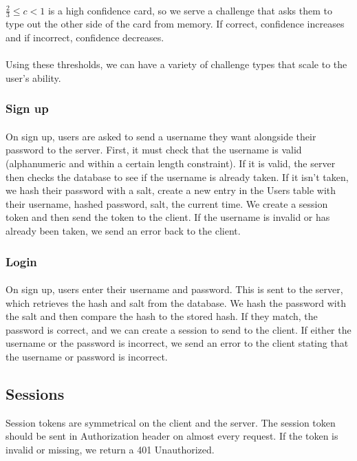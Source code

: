 \documentclass{report}
\begin{document}
\paragraph{}
$\frac{2}{3} \leq c < 1$ is a high confidence card, so we serve a challenge that asks them to type out the other side of the card from memory. If correct, confidence increases and if incorrect, confidence decreases.

\paragraph{}
Using these thresholds, we can have a variety of challenge types that scale to the user's ability.

\subsubsection{Sign up}
\paragraph{}
On sign up, users are asked to send a username they want alongside their password to the server. First, it must check that the username is valid (alphanumeric and within a certain length constraint). If it is valid, the server then checks the database to see if the username is already taken. If it isn't taken, we hash their password with a salt, create a new entry in the Users table with their username, hashed password, salt, the current time. We create a session token and then send the token to the client. If the username is invalid or has already been taken, we send an error back to the client.

\subsubsection{Login}
\paragraph{}
On sign up, users enter their username and password. This is sent to the server, which retrieves the hash and salt from the database. We hash the password with the salt and then compare the hash to the stored hash. If they match, the password is correct, and we can create a session to send to the client. If either the username or the password is incorrect, we send an error to the client stating that the username or password is incorrect.

\subsection{Sessions}
Session tokens are symmetrical on the client and the server. The session token should be sent in Authorization header on almost every request. If the token is invalid or missing, we return a 401 Unauthorized.
\end{document}
